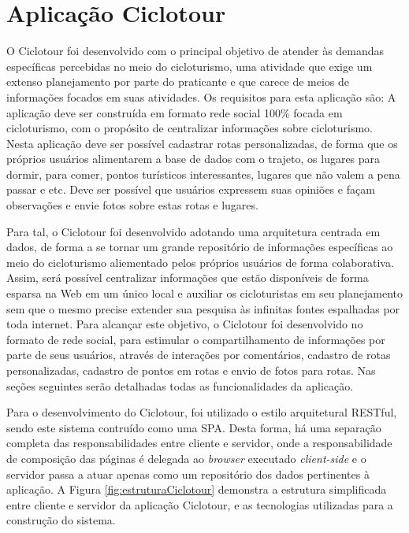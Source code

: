 \section{Aplicação Ciclotour}
O Ciclotour foi desenvolvido com o principal objetivo de atender às demandas específicas percebidas no meio do cicloturismo, uma atividade que exige
um extenso planejamento por parte do praticante e que carece de meios de informações focados em suas atividades. Os requisitos para esta aplicação
são: A aplicação deve ser construída em formato rede social 100\% focada em cicloturismo, com o propósito de centralizar informações sobre 
cicloturismo. Nesta aplicação deve ser possível cadastrar rotas personalizadas, de forma que os próprios usuários alimentarem a base de dados com 
o trajeto, os lugares para dormir, para comer, pontos turísticos interessantes, lugares que não valem a pena passar e etc. Deve ser possível que 
usuários expressem suas opiniões e façam observações e envie fotos sobre estas rotas e lugares.

Para tal, o Ciclotour foi desenvolvido adotando uma arquitetura centrada em dados, de forma a se tornar um grande repositório de informações 
específicas ao meio do cicloturismo aliementado pelos próprios usuários de forma colaborativa. Assim, será possível centralizar informações que 
estão disponíveis de forma esparsa na Web em um único local e auxiliar os cicloturistas em seu planejamento sem que o mesmo precise extender sua 
pesquisa às infinitas fontes espalhadas por toda internet. Para alcançar este objetivo, o Ciclotour foi desenvolvido no formato de rede social, para 
estimular o compartilhamento de informações por parte de seus usuários, através de interações por comentários, cadastro de rotas personalizadas, 
cadastro de pontos em rotas e envio de fotos para rotas. Nas seções seguintes serão detalhadas todas as funcionalidades da aplicação.

Para o desenvolvimento do Ciclotour, foi utilizado o estilo arquitetural RESTful, sendo este sistema contruído como uma SPA. Desta forma, há
uma separação completa das responsabilidades entre cliente e servidor, onde a responsabilidade de composição das páginas é delegada ao 
\textit{browser} executado \textit{client-side} e o servidor passa a atuar apenas como um repositório dos dados pertinentes à aplicação. A Figura 
\ref{fig:estruturaCiclotour} demonstra a estrutura simplificada entre cliente e servidor da aplicação Ciclotour, e as tecnologias utilizadas para
a construção do sistema.

